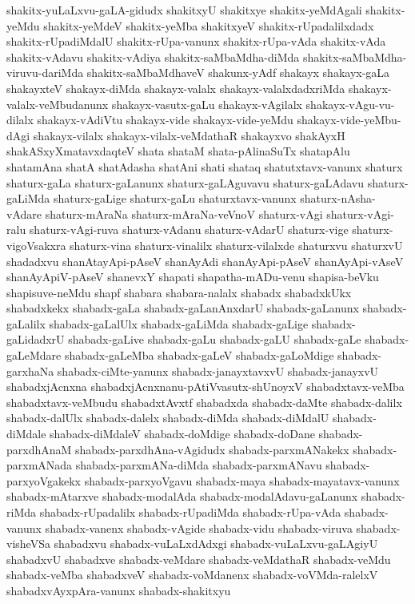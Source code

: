 {shakitx-yuLaLxvu-gaLA-gidudx
shakitxyU
shakitxye
shakitx-yeMdAgali
shakitx-yeMdu
shakitx-yeMdeV
shakitx-yeMba
shakitxyeV
shakitx-rUpadalilxdadx
shakitx-rUpadiMdalU
shakitx-rUpa-vanunx
shakitx-rUpa-vAda
shakitx-vAda
shakitx-vAdavu
shakitx-vAdiya
shakitx-saMbaMdha-diMda
shakitx-saMbaMdha-viruvu-dariMda
shakitx-saMbaMdhaveV
shakunx-yAdf
shakayx
shakayx-gaLa
shakayxteV
shakayx-diMda
shakayx-valalx
shakayx-valalxdadxriMda
shakayx-valalx-veMbudanunx
shakayx-vasutx-gaLu
shakayx-vAgilalx
shakayx-vAgu-vu-dilalx
shakayx-vAdiVtu
shakayx-vide
shakayx-vide-yeMdu
shakayx-vide-yeMbu-dAgi
shakayx-vilalx
shakayx-vilalx-veMdathaR
shakayxvo
shakAyxH
shakASxyXmatavxdaqteV
shata
shataM
shata-pAlinaSuTx
shatapAlu
shatamAna
shatA
shatAdasha
shatAni
shati
shataq
shatutxtavx-vanunx
shaturx
shaturx-gaLa
shaturx-gaLanunx
shaturx-gaLAguvavu
shaturx-gaLAdavu
shaturx-gaLiMda
shaturx-gaLige
shaturx-gaLu
shaturxtavx-vanunx
shaturx-nAsha-vAdare
shaturx-mAraNa
shaturx-mAraNa-veVnoV
shaturx-vAgi
shaturx-vAgi-ralu
shaturx-vAgi-ruva
shaturx-vAdanu
shaturx-vAdarU
shaturx-vige
shaturx-vigoVsakxra
shaturx-vina
shaturx-vinalilx
shaturx-vilalxde
shaturxvu
shaturxvU
shadadxvu
shanAtayApi-pAseV
shanAyAdi
shanAyApi-pAseV
shanAyApi-vAseV
shanAyApiV-pAseV
shanevxY
shapati
shapatha-mADu-venu
shapisa-beVku
shapisuve-neMdu
shapf
shabara
shabara-nalalx
shabadx
shabadxkUkx
shabadxkekx
shabadx-gaLa
shabadx-gaLanAnxdarU
shabadx-gaLanunx
shabadx-gaLalilx
shabadx-gaLalUlx
shabadx-gaLiMda
shabadx-gaLige
shabadx-gaLidadxrU
shabadx-gaLive
shabadx-gaLu
shabadx-gaLU
shabadx-gaLe
shabadx-gaLeMdare
shabadx-gaLeMba
shabadx-gaLeV
shabadx-gaLoMdige
shabadx-garxhaNa
shabadx-ciMte-yanunx
shabadx-janayxtavxvU
shabadx-janayxvU
shabadxjAcnxna
shabadxjAcnxnanu-pAtiVvasutx-shUnoyxV
shabadxtavx-veMba
shabadxtavx-veMbudu
shabadxtAvxtf
shabadxda
shabadx-daMte
shabadx-dalilx
shabadx-dalUlx
shabadx-dalelx
shabadx-diMda
shabadx-diMdalU
shabadx-diMdale
shabadx-diMdaleV
shabadx-doMdige
shabadx-doDane
shabadx-parxdhAnaM
shabadx-parxdhAna-vAgidudx
shabadx-parxmANakekx
shabadx-parxmANada
shabadx-parxmANa-diMda
shabadx-parxmANavu
shabadx-parxyoVgakekx
shabadx-parxyoVgavu
shabadx-maya
shabadx-mayatavx-vanunx
shabadx-mAtarxve
shabadx-modalAda
shabadx-modalAdavu-gaLanunx
shabadx-riMda
shabadx-rUpadalilx
shabadx-rUpadiMda
shabadx-rUpa-vAda
shabadx-vanunx
shabadx-vanenx
shabadx-vAgide
shabadx-vidu
shabadx-viruva
shabadx-visheVSa
shabadxvu
shabadx-vuLaLxdAdxgi
shabadx-vuLaLxvu-gaLAgiyU
shabadxvU
shabadxve
shabadx-veMdare
shabadx-veMdathaR
shabadx-veMdu
shabadx-veMba
shabadxveV
shabadx-voMdanenx
shabadx-voVMda-ralelxV
shabadxvAyxpAra-vanunx
shabadx-shakitxyu
}
